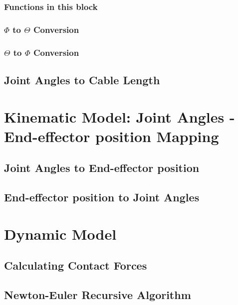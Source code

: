 \documentclass[a4paper,12pt]{report}
\begin{document}
\begin{appendices}
	\subsubsection{Functions in this block}
	
	\subsubsection{$ \Phi $ to $ \Theta $ Conversion}
	
	\subsubsection{$ \Theta $ to $ \Phi $ Conversion}
	
	
	\subsection{Joint Angles to Cable Length}
	

	
	\section{Kinematic Model: Joint Angles - End-effector position Mapping}
	\label{appendix:c-b}
	
	\subsection{Joint Angles to End-effector position}
	
	
	\subsection{End-effector position to Joint Angles}
	
	
	\section{Dynamic Model}
	\subsection{Calculating Contact Forces}
	
	\subsection{Newton-Euler Recursive Algorithm}
	
	
\end{appendices}



\end{document}
